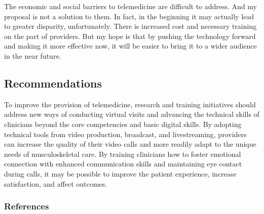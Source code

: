 \documentclass[
  letterpaper,
]{article}
\begin{document}
The economic and social barriers to telemedicine are difficult to
address. And my proposal is not a solution to them. In fact, in the
beginning it may actually lead to greater disparity, unfortunately.
There is increased cost and necessary training on the part of providers.
But my hope is that by pushing the technology forward and making it more
effective now, it will be easier to bring it to a wider audience in the
near future.

\subsection{Recommendations}\label{recommendations}

To improve the provision of telemedicine, research and training
initiatives should address new ways of conducting virtual visits and
advancing the technical skills of clinicians beyond the core
competencies and basic digital skills. By adopting technical tools from
video production, broadcast, and livestreaming, providers can increase
the quality of their video calls and more readily adapt to the unique
needs of musculoskeletal care. By training clinicians how to foster
emotional connection with enhanced communication skills and maintaining
eye contact during calls, it may be possible to improve the patient
experience, increase satisfaction, and affect outcomes.

\subsubsection*{References}\label{references}
\end{document}
